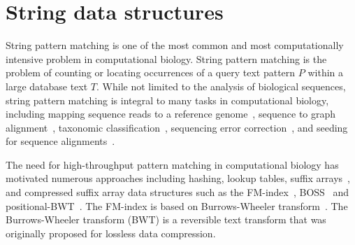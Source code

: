 \section{String data structures}

%
String pattern matching is one of the most common and most computationally intensive problem in computational biology.
%
String pattern matching is the problem of counting or locating occurrences of a query text pattern $P$ within a large database text $T$. While not limited to the analysis of biological sequences, string pattern matching is integral to many tasks in computational biology, including mapping sequence reads to a reference genome~\cite{li2009fast,langmead2009ultrafast}, sequence to graph alignment~\cite{Jain2020}, taxonomic classification~\cite{menzel2016fast,kim2016centrifuge}, sequencing error correction~\cite{huang2017efficient}, and seeding for sequence alignments~\cite{buchfink2015fast,altschul1990basic,steinegger2017mmseqs2}.

The need for high-throughput pattern matching in computational biology has motivated numerous approaches including hashing, lookup tables, suffix arrays~\cite{manber1993suffix}, and compressed suffix array data structures such as the FM-index~\cite{ferragina2000opportunistic}, BOSS~\cite{Muggli2019} and positional-BWT~\cite{Durbin2014}.
The FM-index is based on Burrows-Wheeler transform~\cite{burrows1994block}. The Burrows-Wheeler transform (BWT) is a reversible text transform that was originally proposed for lossless data compression.



